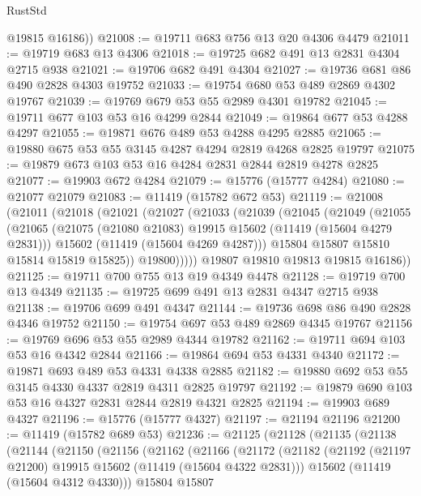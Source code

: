 \begin{lexlean}{RustStd}
\begin{coremodule}
        @19815
        @16186))
@21008 := @19711 @683 @756 @13 @20 @4306 @4479
@21011 := @19719 @683 @13 @4306
@21018 := @19725 @682 @491 @13 @2831 @4304 @2715 @938
@21021 := @19706 @682 @491 @4304
@21027 := @19736 @681 @86 @490 @2828 @4303 @19752
@21033 := @19754 @680 @53 @489 @2869 @4302 @19767
@21039 := @19769 @679 @53 @55 @2989 @4301 @19782
@21045 := @19711 @677 @103 @53 @16 @4299 @2844
@21049 := @19864 @677 @53 @4288 @4297
@21055 := @19871 @676 @489 @53 @4288 @4295 @2885
@21065 := @19880 @675 @53 @55 @3145 @4287 @4294 @2819 @4268 @2825 @19797
@21075 := @19879 @673 @103 @53 @16 @4284 @2831 @2844 @2819 @4278 @2825
@21077 := @19903 @672 @4284
@21079 := @15776 (@15777 @4284)
@21080 := @21077 @21079
@21083 := @11419 (@15782 @672 @53)
@21119 := @21008
    (@21011
      (@21018
        (@21021
          (@21027
            (@21033
              (@21039
                (@21045
                  (@21049
                    (@21055
                      (@21065
                        (@21075 (@21080 @21083) @19915 @15602 (@11419 (@15604 @4279 @2831)))
                        @15602
                        (@11419 (@15604 @4269 @4287)))
                      @15804
                      @15807
                      @15810
                      @15814
                      @15819
                      @15825))
                  @19800)))))
        @19807
        @19810
        @19813
        @19815
        @16186))
@21125 := @19711 @700 @755 @13 @19 @4349 @4478
@21128 := @19719 @700 @13 @4349
@21135 := @19725 @699 @491 @13 @2831 @4347 @2715 @938
@21138 := @19706 @699 @491 @4347
@21144 := @19736 @698 @86 @490 @2828 @4346 @19752
@21150 := @19754 @697 @53 @489 @2869 @4345 @19767
@21156 := @19769 @696 @53 @55 @2989 @4344 @19782
@21162 := @19711 @694 @103 @53 @16 @4342 @2844
@21166 := @19864 @694 @53 @4331 @4340
@21172 := @19871 @693 @489 @53 @4331 @4338 @2885
@21182 := @19880 @692 @53 @55 @3145 @4330 @4337 @2819 @4311 @2825 @19797
@21192 := @19879 @690 @103 @53 @16 @4327 @2831 @2844 @2819 @4321 @2825
@21194 := @19903 @689 @4327
@21196 := @15776 (@15777 @4327)
@21197 := @21194 @21196
@21200 := @11419 (@15782 @689 @53)
@21236 := @21125
    (@21128
      (@21135
        (@21138
          (@21144
            (@21150
              (@21156
                (@21162
                  (@21166
                    (@21172
                      (@21182
                        (@21192 (@21197 @21200) @19915 @15602 (@11419 (@15604 @4322 @2831)))
                        @15602
                        (@11419 (@15604 @4312 @4330)))
                      @15804
                      @15807

\end{coremodule}
\end{lexlean}
